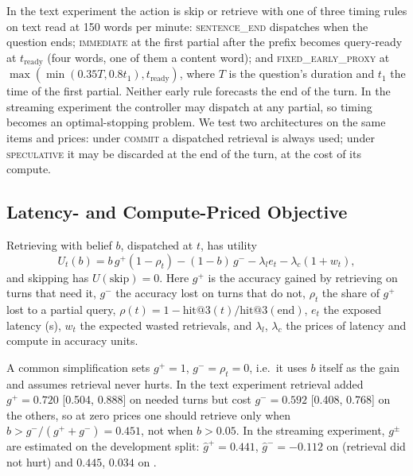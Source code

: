 In the text experiment the action is skip or retrieve with one of three
timing rules on text read at 150 words per minute: \textsc{sentence\_end}
dispatches when the question ends; \textsc{immediate} at the first partial
after the prefix becomes query-ready at $t_{\text{ready}}$ (four words, one of
them a content word); and \textsc{fixed\_early\_proxy} at
$\max(\min(0.35T,0.8t_1),t_{\text{ready}})$, where $T$ is the question's
duration and $t_1$ the time of the first partial. Neither early rule forecasts the end of the turn. In the
streaming experiment the controller may dispatch at any partial, so timing
becomes an optimal-stopping problem. We test two architectures on the same
items and prices: under \textsc{commit} a dispatched retrieval is always used;
under \textsc{speculative} it may be discarded at the end of the turn, at the
cost of its compute.

\subsection{Latency- and Compute-Priced Objective}
\label{subsec:priced_objective}

Retrieving with belief $b$, dispatched at $t$, has utility
\begin{equation}
U_t(b)=b\,g^{+}(1-\rho_t)-(1-b)\,g^{-}-\lambda_l e_t-\lambda_c(1+w_t),
\label{eq:obj}
\end{equation}
and skipping has $U(\text{skip})=0$. Here $g^{+}$ is the accuracy gained by
retrieving on turns that need it, $g^{-}$ the accuracy lost on turns that do
not, $\rho_t$ the share of $g^{+}$ lost to a partial query,
$\rho(t)=1-\text{hit@3}(t)/\text{hit@3}(\text{end})$, $e_t$ the exposed
latency (s), $w_t$ the expected wasted retrievals, and $\lambda_l$,
$\lambda_c$ the prices of latency and compute in accuracy units.

A common simplification sets $g^{+}=1$, $g^{-}=\rho_t=0$, i.e.\ it uses $b$
itself as the gain and assumes retrieval never hurts. In the text experiment
retrieval added $g^{+}=0.720$ [0.504, 0.888] on needed turns but cost
$g^{-}=0.592$ [0.408, 0.768] on the others, so at zero prices one should
retrieve only when $b>g^{-}/(g^{+}+g^{-})=0.451$, not when $b>0.05$. In the
streaming experiment, $g^{\pm}$ are estimated on the development split:
$\hat g^{+}=0.441$, $\hat g^{-}=-0.112$ on  (retrieval did not
hurt) and $0.445$, $0.034$ on .

